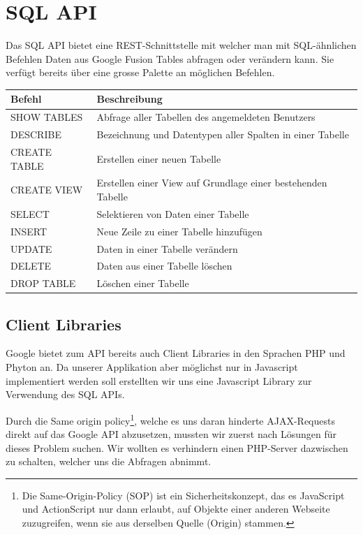 \section{SQL API}
Das SQL API bietet eine REST-Schnittstelle mit welcher man mit SQL-ähnlichen Befehlen Daten aus Google Fusion Tables abfragen oder verändern kann. Sie verfügt bereits über eine grosse Palette an möglichen Befehlen.

\begin{tabular}{|l|l|}
\hline 
Befehl & Beschreibung \\ 
\hline 
SHOW TABLES & Abfrage aller Tabellen des angemeldeten Benutzers \\ 
\hline 
DESCRIBE & Bezeichnung und Datentypen aller Spalten in einer Tabelle \\ 
\hline 
CREATE TABLE & Erstellen einer neuen Tabelle \\ 
\hline 
CREATE VIEW & Erstellen einer View auf Grundlage einer bestehenden Tabelle \\ 
\hline 
SELECT & Selektieren von Daten einer Tabelle \\ 
\hline 
INSERT & Neue Zeile zu einer Tabelle hinzufügen \\ 
\hline 
UPDATE & Daten in einer Tabelle verändern \\ 
\hline 
DELETE & Daten aus einer Tabelle löschen \\ 
\hline 
DROP TABLE & Löschen einer Tabelle \\ 
\hline 
\end{tabular}

\subsection{Client Libraries}
Google bietet zum API bereits auch Client Libraries in den Sprachen PHP und Phyton an. Da unserer Applikation aber möglichst nur in Javascript implementiert werden soll erstellten wir uns eine Javascript Library zur Verwendung des SQL APIs.

Durch die Same origin policy\footnote{Die Same-Origin-Policy (SOP) ist ein Sicherheitskonzept, das es JavaScript und ActionScript nur dann erlaubt, auf Objekte einer anderen Webseite zuzugreifen, wenn sie aus derselben Quelle (Origin) stammen.\cite{sop} }, welche es uns daran hinderte AJAX-Requests direkt auf das Google API abzusetzen, mussten wir zuerst nach Lösungen für dieses Problem suchen. Wir wollten es verhindern einen PHP-Server dazwischen zu schalten, welcher uns die Abfragen abnimmt.

